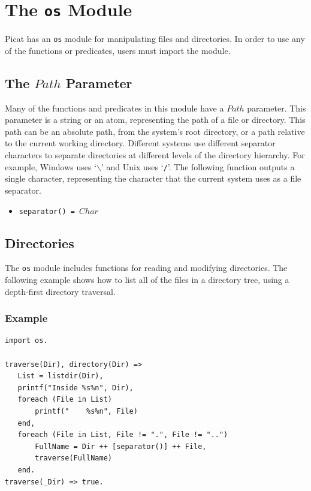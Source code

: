 \chapter{The \texttt{os} Module}
Picat has an \texttt{os} module for manipulating files and directories.  In order to use any of the functions or predicates, users must import the module.

\section{The $Path$ Parameter}
Many of the functions and predicates in this module have a $Path$ parameter.  This parameter is a string or an atom, representing the path of a file or directory.  This path can be an absolute path, from the system's root directory, or a path relative to the current working directory.  Different systems use different separator characters to separate directories at different levels of the directory hierarchy.  For example, Windows uses `\texttt{$\backslash$}' and Unix uses `\texttt{/}'.  The following function outputs a single character, representing the character that the current system uses as a file separator.
\begin{itemize}
\item \texttt{separator() = $Char$}
\end{itemize}

\section{Directories}
The \texttt{os} module includes functions for reading and modifying directories.  The following example shows how to list all of the files in a directory tree, using a depth-first directory traversal.

\subsection*{Example}
\begin{verbatim}
import os.

traverse(Dir), directory(Dir) =>
   List = listdir(Dir),
   printf("Inside %s%n", Dir),
   foreach (File in List)
       printf("    %s%n", File)
   end,
   foreach (File in List, File != ".", File != "..")
       FullName = Dir ++ [separator()] ++ File,
       traverse(FullName) 
   end.
traverse(_Dir) => true.
\end{verbatim}

